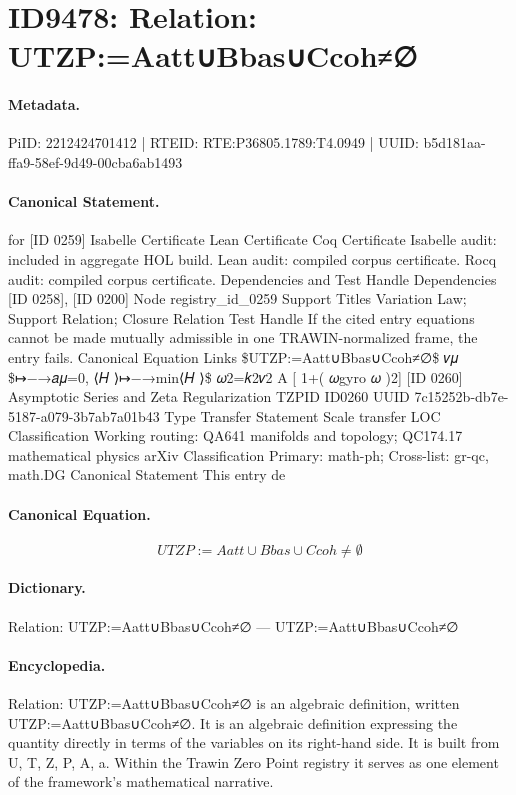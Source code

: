\section*{ID9478: Relation: UTZP:=Aatt∪Bbas∪Ccoh≠∅}
\paragraph{Metadata.}
PiID: 2212424701412 | RTEID: RTE:P36805.1789:T4.0949 | UUID: b5d181aa-ffa9-58ef-9d49-00cba6ab1493

\paragraph{Canonical Statement.}
for [ID 0259] Isabelle Certificate Lean Certificate Coq Certificate Isabelle audit: included in aggregate HOL build. Lean audit: compiled corpus certificate. Rocq audit: compiled corpus certificate. Dependencies and Test Handle Dependencies [ID 0258], [ID 0200] Node registry\_id\_0259 Support Titles Variation Law; Support Relation; Closure Relation Test Handle If the cited entry equations cannot be made mutually admissible in one TRAWIN-normalized frame, the entry fails. Canonical Equation Links \$UTZP:=Aatt∪Bbas∪Ccoh≠∅\$ 𝑣𝜇 \$↦−→𝑎𝜇=0, ⟨𝐻 ⟩↦−→min⟨𝐻 ⟩\$ 𝜔2=𝑘2𝑣2 A [ 1+( 𝜔gyro 𝜔 )2] [ID 0260] Asymptotic Series and Zeta Regularization TZPID ID0260 UUID 7c15252b-db7e-5187-a079-3b7ab7a01b43 Type Transfer Statement Scale transfer LOC Classification Working routing: QA641 manifolds and topology; QC174.17 mathematical physics arXiv Classification Primary: math-ph; Cross-list: gr-qc, math.DG Canonical Statement This entry de

\paragraph{Canonical Equation.}
\[
UTZP:=Aatt∪Bbas∪Ccoh≠∅
\]

\paragraph{Dictionary.}
Relation: UTZP:=Aatt∪Bbas∪Ccoh≠∅ — UTZP:=Aatt∪Bbas∪Ccoh≠∅

\paragraph{Encyclopedia.}
Relation: UTZP:=Aatt∪Bbas∪Ccoh≠∅ is an algebraic definition, written UTZP:=Aatt∪Bbas∪Ccoh≠∅. It is an algebraic definition expressing the quantity directly in terms of the variables on its right-hand side. It is built from U, T, Z, P, A, a. Within the Trawin Zero Point registry it serves as one element of the framework's mathematical narrative.
